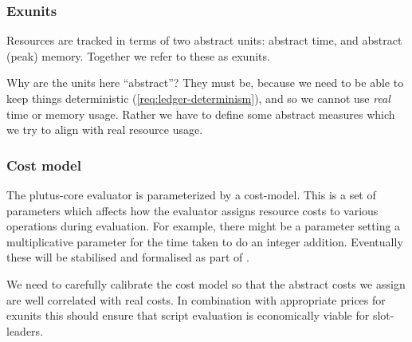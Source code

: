 \subsubsection{Exunits}

Resources are tracked in terms of two abstract units: abstract time, and abstract (peak) memory.
Together we refer to these as \gls{exunits}.

Why are the units here ``abstract''?
They must be, because we need to be able to keep things deterministic (\cref{req:ledger-determinism}), and so we cannot use \emph{real} time or memory usage.
Rather we have to define some abstract measures which we try to align with real resource usage.

\subsubsection{Cost model}

The \gls{plutus-core} evaluator is parameterized by a \gls{cost-model}.
This is a set of parameters which affects how the evaluator assigns resource costs to various operations during evaluation.
For example, there might be a parameter setting a multiplicative parameter for the time taken to do an integer addition.
Eventually these will be stabilised and formalised as part of \textcite{plutus-core-spec}.

We need to carefully calibrate the cost model so that the abstract costs we assign are well correlated with real costs.
In combination with appropriate prices for \gls{exunits} this should ensure that script evaluation is economically viable for \glspl{slot-leader}.
